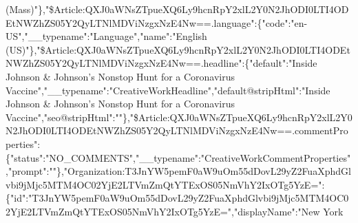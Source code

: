 (Mass)"\},"\$Article:QXJ0aWNsZTpueXQ6Ly9hcnRpY2xlL2Y0N2JhODI0LTI4ODEtNWZhZS05Y2QyLTNlMDViNzgxNzE4Nw==.language":\{"code":"en-US","\_\_typename":"Language","name":"English
(US)"\},"\$Article:QXJ0aWNsZTpueXQ6Ly9hcnRpY2xlL2Y0N2JhODI0LTI4ODEtNWZhZS05Y2QyLTNlMDViNzgxNzE4Nw==.headline":\{"default":"Inside
Johnson \& Johnson's Nonstop Hunt for a Coronavirus
Vaccine","\_\_typename":"CreativeWorkHeadline","default@stripHtml":"Inside
Johnson \& Johnson's Nonstop Hunt for a Coronavirus
Vaccine","seo@stripHtml":""\},"\$Article:QXJ0aWNsZTpueXQ6Ly9hcnRpY2xlL2Y0N2JhODI0LTI4ODEtNWZhZS05Y2QyLTNlMDViNzgxNzE4Nw==.commentProperties":\{"status":"NO\_COMMENTS","\_\_typename":"CreativeWorkCommentProperties","prompt":""\},"Organization:T3JnYW5pemF0aW9uOm55dDovL29yZ2FuaXphdGlvbi9jMjc5MTM4OC02YjE2LTVmZmQtYTExOS05NmVhY2IxOTg5YzE=":\{"id":"T3JnYW5pemF0aW9uOm55dDovL29yZ2FuaXphdGlvbi9jMjc5MTM4OC02YjE2LTVmZmQtYTExOS05NmVhY2IxOTg5YzE=","displayName":"New
York
